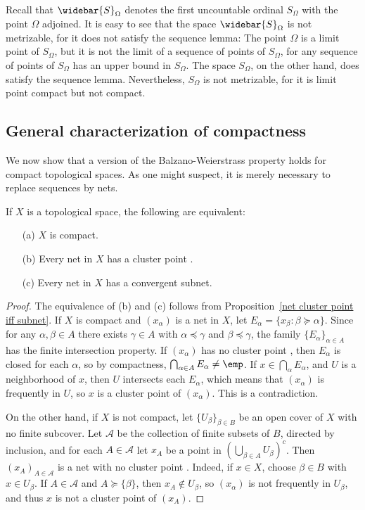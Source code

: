 \begin{example}
Recall that $\widebar{S}_\Omega$ denotes the first uncountable ordinal $S_\Omega$ with the point $\Omega$ adjoined. It is easy to see that the space $\widebar{S}_\Omega$ is not metrizable, for it does not satisfy the sequence lemma: The point $\Omega$ is a limit point of $S_\Omega$, but it is not the limit of a sequence of points of $S_\Omega$, for any sequence of points of $S_\Omega$ has an upper bound in $S_\Omega$. The space $S_\Omega$, on the other hand, does satisfy the sequence lemma. Nevertheless, $S_\Omega$ is not metrizable, for it is limit point compact but not compact.
\end{example}
\subsection{General characterization of compactness}
We now show that a version of the Balzano-Weierstrass property holds for compact topological spaces. As one might suspect, it is merely necessary to replace sequences by nets.
\begin{theorem}\label{compact iff net}
If $X$ is a topological space, the following are equivalent:
\begin{itemize}
\item[(a)] $X$ is compact.
\item[(b)] Every net in $X$ has a cluster point .
\item[(c)] Every net in $X$ has a convergent subnet.
\end{itemize}
\end{theorem}
\begin{proof}
The equivalence of (b) and (c) follows from Proposition~\ref{net cluster point iff subnet}. If $X$ is compact and $(x_\alpha)$ is a net in $X$, let $E_\alpha=\{x_\beta:\beta\succeq\alpha\}$. Since for any $\alpha,\beta\in A$ there exists $\gamma\in A$ with $\alpha\preceq\gamma$ and $\beta\preceq\gamma$, the family $\{E_\alpha\}_{\alpha\in A}$ has the finite intersection property. If $(x_\alpha)$ has no cluster point , then $E_\alpha$ is closed for each $\alpha$, so by compactness, $\bigcap_{\alpha\in A}E_\alpha\neq\emp$. If $x\in\bigcap_\alpha E_\alpha$, and $U$ is a neighborhood of $x$, then $U$ intersects each $E_\alpha$, which means that $(x_\alpha)$ is frequently in $U$, so $x$ is a cluster point  of $(x_\alpha)$. This is a contradiction.\par
On the other hand, if $X$ is not compact, let $\{U_\beta\}_{\beta\in B}$ be an open cover of $X$ with no finite subcover. Let $\mathcal{A}$ be the collection of finite subsets of $B$, directed by inclusion, and for each $A\in\mathcal{A}$ let $x_A$ be a point in $(\bigcup_{\beta\in A}U_\beta)^c$. Then $(x_A)_{A\in\mathcal{A}}$ is a net with no cluster point . Indeed, if $x\in X$, choose $\beta\in B$ with $x\in U_\beta$. If $A\in\mathcal{A}$ and $A\succeq\{\beta\}$, then $x_A\notin U_\beta$, so $(x_\alpha)$ is not frequently in $U_\beta$, and thus $x$ is not a cluster point  of $(x_A)$.
\end{proof}
